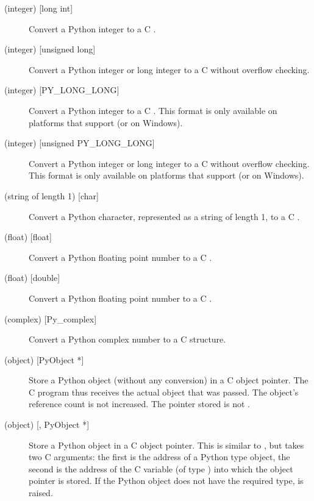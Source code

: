 \begin{description}
  \item[ (integer) {[long int]}]
  Convert a Python integer to a C .

  \item[ (integer) {[unsigned long]}]
  Convert a Python integer or long integer to a C  without
  overflow checking.  

  \item[ (integer) {[PY_LONG_LONG]}]
  Convert a Python integer to a C .  This format is
  only available on platforms that support  (or
   on Windows).

  \item[ (integer) {[unsigned PY_LONG_LONG]}]
  Convert a Python integer or long integer to a C 
  without overflow checking.  This format is only available on
  platforms that support  (or
   on Windows).  

  \item[ (string of length 1) {[char]}]
  Convert a Python character, represented as a string of length 1, to
  a C .

  \item[ (float) {[float]}]
  Convert a Python floating point number to a C .

  \item[ (float) {[double]}]
  Convert a Python floating point number to a C .

  \item[ (complex) {[Py_complex]}]
  Convert a Python complex number to a C  structure.

  \item[ (object) {[PyObject *]}]
  Store a Python object (without any conversion) in a C object
  pointer.  The C program thus receives the actual object that was
  passed.  The object's reference count is not increased.  The pointer
  stored is not \NULL.

  \item[ (object) {[, PyObject *]}]
  Store a Python object in a C object pointer.  This is similar to
  , but takes two C arguments: the first is the address of a
  Python type object, the second is the address of the C variable (of
  type ) into which the object pointer is stored.  If
  the Python object does not have the required type,
   is raised.


\end{description}
